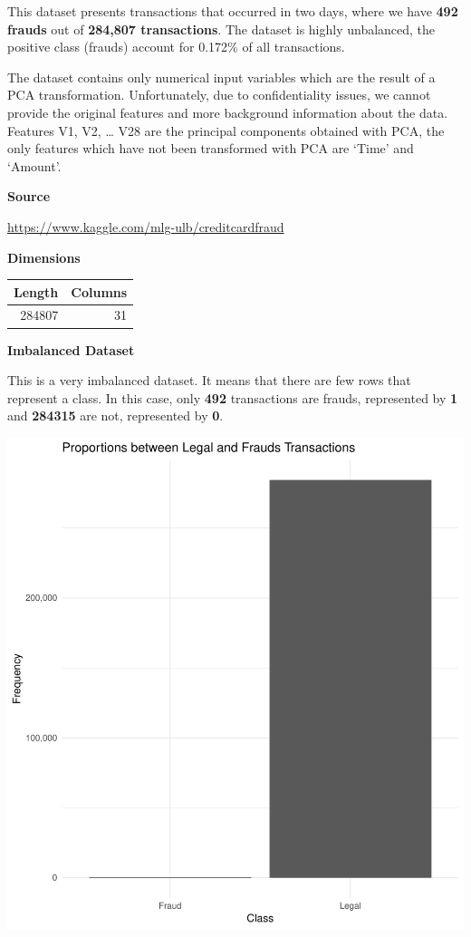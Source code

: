 \documentclass[]{article}
\begin{document}
This dataset presents transactions that occurred in two days, where we
have \textbf{492 frauds} out of \textbf{284,807 transactions}. The
dataset is highly unbalanced, the positive class (frauds) account for
0.172\% of all transactions.

The dataset contains only numerical input variables which are the result
of a PCA transformation. Unfortunately, due to confidentiality issues,
we cannot provide the original features and more background information
about the data. Features V1, V2, \ldots{} V28 are the principal
components obtained with PCA, the only features which have not been
transformed with PCA are `Time' and `Amount'.

\textbf{Source}

\url{https://www.kaggle.com/mlg-ulb/creditcardfraud}

\textbf{Dimensions}

\begin{table}[H]
\centering\begingroup\fontsize{10}{12}\selectfont

\begin{tabular}{r|r}
\hline
Length & Columns\\
\hline
284807 & 31\\
\hline
\end{tabular}
\endgroup{}
\end{table}

\textbf{Imbalanced Dataset}

This is a very imbalanced dataset. It means that there are few rows that
represent a class. In this case, only \textbf{492} transactions are
frauds, represented by \textbf{1} and \textbf{284315} are not,
represented by \textbf{0}.

\begin{center}\includegraphics{Credit_Card_Fraud_Detection_Project_Report_files/figure-latex/unnamed-chunk-6-1} \end{center}
\end{document}
